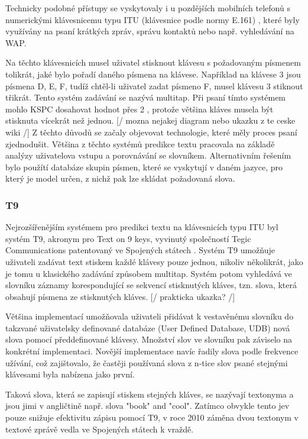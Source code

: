 \documentclass{article}
\begin{document}
Technicky podobné přístupy se vyskytovaly i u pozdějších mobilních telefonů s numerickými klávesnicemu typu ITU (klávesnice podle normy E.161) \cite{mfmtlqoxL48pMk3T}, které byly využívány na psaní krátkých zpráv, správu kontaktů nebo např. vyhledávání na WAP. 

Na těchto klávesnicích musel uživatel stisknout klávesu s požadovaným písmenem tolikrát, jaké bylo pořadí daného písmena na klávese. Například na klávese 3 jsou písmena D, E, F, tudíž chtěl-li uživatel zadat písmeno F, musel klávesu 3 stiknout třikrát. Tento systém zadávání se nazývá multitap. Při psaní tímto systémem mohlo KSPC dosahovat hodnot přes 2 \cite{dXVv6nPb2KifFXYv}, protože většina kláves musela být stisknuta vícekrát než jednou. [/ mozna nejakej diagram nebo ukazku z te ceske wiki /] Z těchto důvodů se začaly objevovat technologie, které měly proces psaní zjednodušit. Většina z těchto systémů predikce textu pracovala na základě analýzy uživatelova vstupu a porovnávání se slovníkem. Alternativním řešením bylo použítí databáze skupin písmen, které se vyskytují v daném jazyce, pro který je model určen, z nichž pak lze skládat požadovaná slova.

\subsubsection{T9}

Nejrozšířenějším 
 systémem pro predikci textu na klávesnicích typu ITU byl systém T9, akronym pro Text on 9 keys, vyvinutý společností Tegic Communications \cite{Edq6tEyjOSzk54RQ} patentovaný ve Spojených státech \cite{Grover1998}. Systém T9 umožňuje uživateli zadávat text stiskem každé klávesy pouze jednou, nikoliv několikrát, jako je tomu u klasického zadávání způsobem multitap. Systém potom vyhledává ve slovníku záznamy korespondující se sekvencí stisknutých kláves, tzn. slova, která obsahují písmena ze stisknutých kláves. [/ prakticka ukazka? /]
 

Většina implementací umožňovala uživateli přidávat k vestavěnému slovníku do takzvané uživatelsky definované databáze (User Defined Database, UDB) nová slova pomocí předdefinované klávesy. Množství slov ve slovníku pak záviselo na konkrétní implementaci. Novější implementace navíc řadily slova podle frekvence užívání, což zajištovalo, že častěji používaná slova z n-tice slov psané stejnými klávesami byla nabízena jako první. 

Taková slova, která se zapisují stiskem stejných kláves, se nazývají textonyma \cite{ZORN2007} a jsou jimi v angličtině např. slova "book" and "cool". Zatímco obvykle tento jev pouze snižuje efektivitu zápisu pomocí T9, v roce 2010 záměna dvou textonym v textové zprávě vedla ve Spojených státech k vraždě. \cite{bjjL0GPb5QxyO1A8} 
\end{document}
